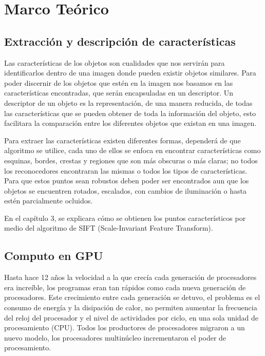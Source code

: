 \chapter {Marco Teórico}

\section {Extracción y descripción de características}

Las características de los objetos son cualidades que nos servirán para identificarlos dentro de una imagen donde pueden existir objetos similares. Para poder discernir de los objetos que estén en la imagen nos basamos en las características encontradas, que serán encapsuladas en un descriptor. Un descriptor de un objeto es la representación, de una manera reducida, de todas las características que se pueden obtener de toda la información del objeto, esto facilitara la comparación entre los diferentes objetos que existan en una imagen.

Para extraer las características existen diferentes formas, dependerá de que algoritmo se utilice, cada uno de ellos se enfoca en encontrar características como esquinas, bordes, crestas y regiones que son más obscuras o más claras; no todos los reconocedores encontraran las mismas o todos los tipos de características. Para que estos puntos sean robustos deben poder ser encontrados aun que los objetos se encuentren rotados, escalados, con cambios de iluminación o hasta estén parcialmente ocluidos.

En el capítulo 3, se explicara cómo se obtienen los puntos característicos por medio del algoritmo de SIFT (Scale-Invariant Feature Transform).


\pagebreak

\section {Computo en GPU}

Hasta hace 12 años la velocidad a la que crecía cada generación de procesadores era increíble, los programas eran tan rápidos como cada nueva generación de procesadores. Este crecimiento entre cada generación se detuvo, el problema es el consumo de energía y la disipación de calor, no permiten aumentar la frecuencia del reloj del procesador y el nivel de actividades por ciclo, en una sola unidad de procesamiento (CPU). Todos los productores de procesadores migraron a un nuevo modelo, los procesadores multinúcleo incrementaron el poder de procesamiento.

